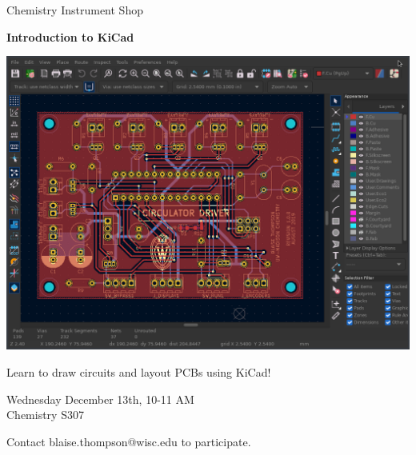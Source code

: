 \documentclass{article}
\begin{document}
\center

\Huge

Chemistry Instrument Shop

\textbf{
Introduction to KiCad
}

\includegraphics[width=\linewidth]{coverart.png}

{
\huge
Learn to draw circuits and layout PCBs using KiCad!
}

\vfill

{
\huge
Wednesday December 13th, 10-11 AM \\
Chemistry S307
}

\vfill

{
\huge
Contact blaise.thompson@wisc.edu to participate.
}
\end{document}
